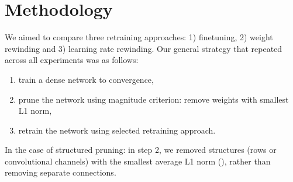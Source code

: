 

\section{Methodology}


We aimed to compare three retraining approaches: 1) finetuning, 2) weight rewinding and 3) learning rate rewinding. Our general strategy that repeated across all experiments was as follows:
\begin{enumerate}
    \item train a dense network to convergence,
    \item prune the network using magnitude criterion: remove weights with smallest L1 norm,
    \item retrain the network using selected retraining approach.
\end{enumerate}

In the case of structured pruning: in step 2, we removed structures (rows or convolutional channels) with the smallest average L1 norm (\cite{structured}), rather than removing separate connections. 

